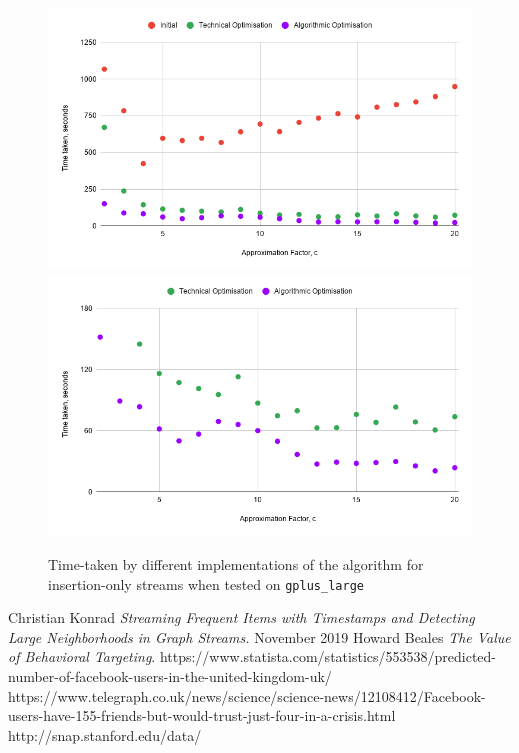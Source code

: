 \documentclass[11pt,twoside,a4paper]{report}
\begin{document}
\begin{figure}
	\label{Figure 12}
	\includegraphics[width=.5\textwidth]{img/insertionOnlyGplusLargeTime1.png}
	\includegraphics[width=.5\textwidth]{img/insertionOnlyGplusLargeTime2.png}
	\caption{Time-taken by different implementations of the algorithm for insertion-only streams when tested on \texttt{gplus\_large}}
\end{figure}

\begin{thebibliography}{9}
	 Christian Konrad \textit{Streaming Frequent Items with Timestamps and Detecting Large Neighborhoods in Graph Streams.} November 2019
	 Howard Beales \textit{The Value of Behavioral Targeting}.
	 https://www.statista.com/statistics/553538/predicted-number-of-facebook-users-in-the-united-kingdom-uk/
	 https://www.telegraph.co.uk/news/science/science-news/12108412/Facebook-users-have-155-friends-but-would-trust-just-four-in-a-crisis.html
	http://snap.stanford.edu/data/
\end{thebibliography}
\end{document}
